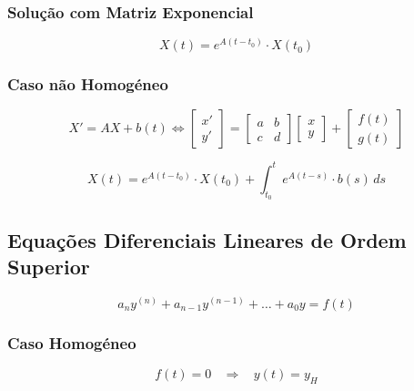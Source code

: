 \documentclass[11pt, a4paper]{article}
\begin{document}
\subsubsection*{Solução com Matriz Exponencial}

\begin{equation*}
    X(t) = e^{A(t-t_0)} \cdot X(t_0)
\end{equation*}

\subsubsection{Caso não Homogéneo}

\begin{equation*}
    X' = AX + b(t) \Leftrightarrow
    \left[ \begin{matrix} x' \\ y' \end{matrix} \right] = 
    \left[ \begin{matrix} a & b \\ c & d \end{matrix} \right]
    \left[ \begin{matrix} x \\ y \end{matrix} \right] + 
    \left[ \begin{matrix} f(t) \\ g(t) \end{matrix} \right]
\end{equation*}

\begin{equation*}
    X(t) = e^{A(t - t_0)} \cdot X(t_0) + \int_{t_0}^{t} e^{A(t-s)} \cdot b(s) \, ds
\end{equation*}

\newpage

\subsection{Equações Diferenciais Lineares de Ordem Superior}

\begin{equation*}
    a_n y^{(n)} + a_{n-1} y^{(n-1)} + \ldots + a_0 y = f(t)
\end{equation*}

\subsubsection{Caso Homogéneo}

\begin{equation*}
    f(t) = 0 \ \ \ \ \Rightarrow \ \ \ \ y(t) = y_H
\end{equation*}
\end{document}
